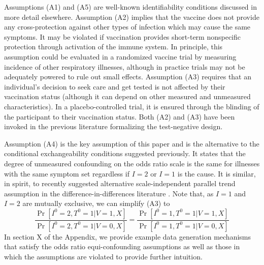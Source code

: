 \documentclass[11pt]{article}
\begin{document}
Assumptions (A1) and (A5) are well-known identifiability conditions discussed in more detail elsewhere. Assumption (A2) implies that the vaccine does not provide any cross-protection against other types of infection which may cause the same symptoms.   It may be violated if vaccination provides short-term nonspecific protection through activation of the immune system. In principle, this assumption could be evaluated in a randomized vaccine trial by measuring incidence of other respiratory illnesses, although in practice trials may not be adequately powered to rule out small effects. Assumption (A3) requires that an individual's decision to seek care and get tested is not affected by their vaccination status (although it can depend on other measured and unmeasured characteristics). In a placebo-controlled trial, it is ensured through the blinding of the participant to their vaccination status. Both (A2) and (A3) have been invoked in the previous literature formalizing the test-negative design. 

Assumption (A4) is the key assumption of this paper and is the alternative to the conditional exchangeability conditions suggested previously. It states that the degree of unmeasured confounding on the odds ratio scale is the same for illnesses with the same symptom set regardless if $I=2$ or $I=1$ is the cause. It is similar, in spirit, to recently suggested alternative scale-independent parallel trend assumption in the difference-in-differences literature \cite{park_universal_2023,tchetgen_universal_2023}. Note that, as $I = 1$ and $I = 2$ are mutually exclusive, we can simplify (A3) to
\begin{equation}
    \frac{\Pr[I^0 = 2, T^0 = 1 | V = 1, X]}{\Pr[I^0 = 2, T^0 = 1 | V = 0, X]} =\frac{\Pr[I^0 = 1, T^0 = 1 | V = 1, X]}{\Pr[I^0 = 1, T^0 = 1 | V = 0, X]}
\end{equation}
In section X of the Appendix, we provide example data generation mechanisms that satisfy the odds ratio equi-confounding assumptions as well as those in which the assumptions are violated to provide further intuition.
\end{document}
